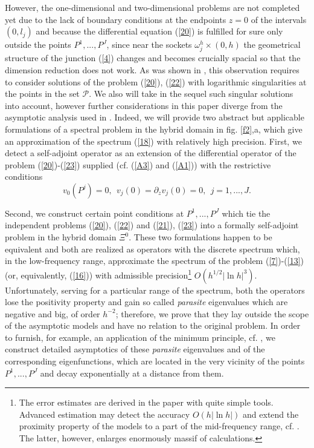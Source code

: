 \documentclass[11pt]{article}%
\numberwithin{equation}{section}
\begin{document}
However, the one-dimensional and two-dimensional problems are not completed
yet due to the lack of boundary conditions at the endpoints $z=0$ of the
intervals $(0,l_{j})$ and because the differential equation (\ref{20}) is
fulfilled for sure only outside the points $P^{1},...,P^{J}$, since near the
sockets $\omega_{j}^{h}\times(0,h)$ the geometrical structure of the junction
(\ref{4}) changes and becomes crucially spacial so that the dimension
reduction does not work. As was shown in \cite{BuCaNa1}, this observation
requires to consider solutions of the problem (\ref{20}), (\ref{22}) with
logarithmic singularities at the points in the set $\mathcal{P}$. We also will
take in the sequel such singular solutions into account, however further
considerations in this paper diverge from the asymptotic analysis used in
\cite{BuCaNa1}. Indeed, we will provide two abstract but applicable
formulations of a spectral problem in the hybrid domain in fig. \ref{f2},a,
which give an approximation of the spectrum (\ref{18}) with relatively high
precision. First, we detect a self-adjoint operator as an extension of the
differential operator of the problem (\ref{20})-(\ref{23}) supplied (cf.
(\ref{A3}) and (\ref{A1})) with the restrictive conditions%
\begin{equation}
v_{0}(P^{j})=0,\ \ v_{j}(0)=\partial_{z}v_{j}(0)=0,\ \ j=1,...,J. \label{too}%
\end{equation}


Second, we construct certain point conditions at $P^{1},...,P^{J}$ which tie
the independent problems (\ref{20}), (\ref{22}) and (\ref{21}), (\ref{23})
into a formally self-adjoint problem in the hybrid domain $\Xi^{0}.$ These two
formulations happen to be equivalent and both are realized as operators with
the discrete spectrum which, in the low-frequency range, approximate the
spectrum of the problem (\ref{7})-(\ref{13}) (or, equivalently, (\ref{16}))
with admissible precision\footnote{The error estimates are derived in the
paper with quite simple tools. Advanced estimation may detect the accuracy
$O(h|\ln h|)$ and extend the proximity property of the models to a part of the
mid-frequency range, cf. \cite{na576}. The latter, however, enlarges
enormously massif of calculations.} $O(h^{1/2}|\ln h|^{3})$. Unfortunately,
serving for a particular range of the spectrum, both the operators lose the
positivity property and gain so called \textit{parasite} eigenvalues which are
negative and big, of order $h^{-2}$; therefore, we prove that they lay outside
the scope of the asymptotic models and have no relation to the original
problem. In order to furnish, for example, an application of the minimum
principle, cf. \cite[Thm. 10.2.1]{BiSo}, we construct detailed asymptotics of
these \textit{parasite} eigenvalues and of the corresponding eigenfunctions,
which are located in the very vicinity of the points $P^{1},...,P^{J}$ and
decay exponentially at a distance from them.
\end{document}
